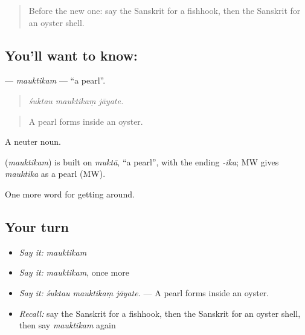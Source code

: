 \label{lesson:SA-C418-mauktikam}



\begin{quote}
Before the new one: say the Sanskrit for a fishhook, then the Sanskrit for an oyster shell.
\end{quote}

\subsection*{You'll want to know: }
\textbf{} — \emph{mauktikam} — \textquotedblleft{}a pearl\textquotedblright{}.

\begin{quote}
  
\end{quote}

\begin{quote}
\emph{śuktau mauktikaṃ jāyate.}
\end{quote}

\begin{quote}
A pearl forms inside an oyster.
\end{quote}

A neuter noun.

\begin{cousinweb}
\textbf{} (\emph{mauktikam}) is built on \emph{muktā}, \textquotedblleft{}a pearl\textquotedblright{}, with the ending \emph{-ika}; MW gives \emph{mauktika} as a pearl (MW).
\end{cousinweb}

\begin{grammarlens}[title={What you've built}]
One more word for getting around.
\end{grammarlens}

\subsection*{Your turn}
\begin{itemize}
\raggedright
  \item \emph{Say it:} \emph{mauktikam}
  \item \emph{Say it:} \emph{mauktikam}, once more
  \item \emph{Say it:} \emph{śuktau mauktikaṃ jāyate.} — A pearl forms inside an oyster.
  \item \emph{Recall:} say the Sanskrit for a fishhook, then the Sanskrit for an oyster shell, then say \emph{mauktikam} again
\end{itemize}

